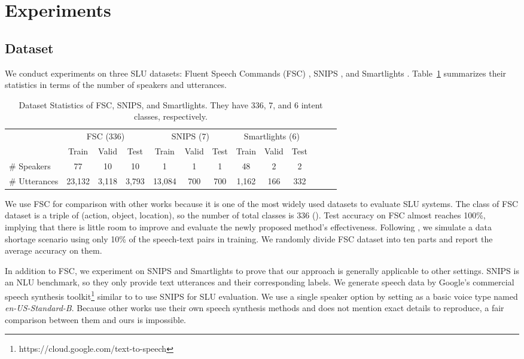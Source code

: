 \section{Experiments}
\label{sec:experiment_setup}

\subsection{Dataset}

We conduct experiments on three SLU datasets: Fluent Speech Commands (FSC) \cite{lugosch2019speech}, SNIPS \cite{coucke2018snips}, and Smartlights \cite{saade2018spoken}.
Table~\ref{tab:statistics} summarizes their statistics in terms of the number of speakers and utterances.

\begin{table}[t]
    \centering
    \scriptsize
    \setlength{\tabcolsep}{3pt}
    \begin{tabular}{lcccccccccccc}
    \toprule
    & \multicolumn{3}{c}{FSC (336)} & \multicolumn{3}{c}{SNIPS (7)} & \multicolumn{3}{c}{Smartlights (6)} \\
    & Train & Valid & Test & Train & Valid & Test & Train & Valid & Test \\
    \midrule
    \# Speakers   & 77 & 10 & 10 & 1 & 1 & 1 & 48 & 2 & 2 \\
    \# Utterances & 23,132 & 3,118 & 3,793 & 13,084 & 700 & 700 & 1,162 & 166 & 332 \\
    \bottomrule
    \end{tabular}
    \caption{
    Dataset Statistics of FSC, SNIPS, and Smartlights.
    They have 336, 7, and 6 intent classes, respectively.
    }
    \label{tab:statistics}
    \vskip -0.15in
\end{table} 
We use FSC for comparison with other works because it is one of the most widely used datasets to evaluate SLU systems.
The class of FSC dataset is a triple of (action, object, location), so the number of total classes is 336 ().
Test accuracy on FSC almost reaches 100\%, implying that there is little room to improve and evaluate the newly proposed method's effectiveness.
Following \cite{lugosch2019speech,cho2020speech}, we simulate a data shortage scenario using only 10\% of the speech-text pairs in training.
We randomly divide FSC dataset into ten parts and report the average accuracy on them.

In addition to FSC, we experiment on SNIPS and Smartlights to prove that our approach is generally applicable to other settings.
SNIPS is an NLU benchmark, so they only provide text utterances and their corresponding labels.
We generate speech data by Google's commercial speech synthesis toolkit\footnote{https://cloud.google.com/text-to-speech} similar to \cite{huang2020learning} to use SNIPS for SLU evaluation.
We use a single speaker option by setting as a basic voice type named \textit{en-US-Standard-B}.
Because other works \cite{huang2020learning,cao2020style} use their own speech synthesis methods and does not mention exact details to reproduce, a fair comparison between them and ours is impossible.

